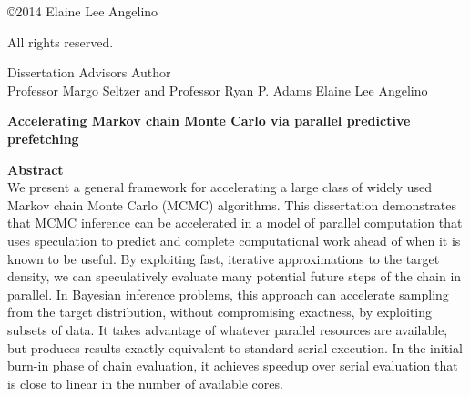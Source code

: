 \copyright 2014 Elaine Lee Angelino

All rights reserved.

\thispagestyle{empty}
\pagestyle{empty}


\newpage

\noi Dissertation Advisors \hfill  Author \\
\noi Professor Margo Seltzer and Professor Ryan P. Adams \hfill Elaine Lee Angelino

\begin{center}
\textsf{\textbf{Accelerating Markov chain Monte Carlo via parallel predictive prefetching}} \\
\end{center}

\begin{flushleft}
\textsf{\textbf{Abstract}} \\

We present a general framework for accelerating a large class of
widely used Markov chain Monte Carlo (MCMC) algorithms.
This dissertation demonstrates that MCMC inference can be accelerated 
in a model of parallel computation that uses speculation to predict and complete
computational work ahead of when it is known to be useful.
By exploiting fast, iterative approximations to the target density, we can
speculatively evaluate many potential future steps of the chain in parallel.
In Bayesian inference problems, this approach can accelerate sampling from the
target distribution, without compromising exactness, by exploiting subsets of data.
It takes advantage of whatever parallel resources are available, but produces
results exactly equivalent to standard serial execution.
In the initial burn-in phase of chain evaluation, it achieves speedup over
serial evaluation that is close to linear in the number of available cores.
\end{flushleft}
